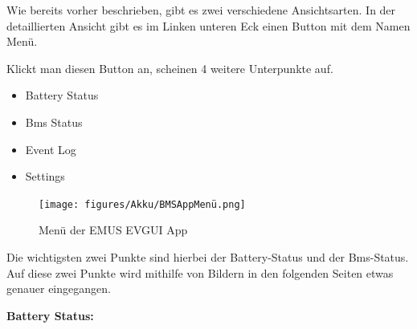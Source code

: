 Wie bereits vorher beschrieben, gibt es zwei verschiedene Ansichtsarten. In der detaillierten Ansicht gibt es im Linken unteren Eck einen Button mit dem Namen Menü.

Klickt man diesen Button an, scheinen 4 weitere Unterpunkte auf. 

\begin{itemize}
\item{Battery Status}\\
\item{Bms Status}\\
\item{Event Log}\\
\item{Settings}\\
\end{itemize}

\begin{figure}[H]
	\begin{center}
		\texttt{[image: figures/Akku/BMSAppMenü.png]}
		\caption{Menü der EMUS EVGUI App\cite{MenüApp}} 
		\label{fig: Menü der EMUS EVGUI App}
	\end{center}
\end{figure}
\newpage

Die wichtigsten zwei Punkte sind hierbei der Battery-Status und der Bms-Status. Auf diese zwei Punkte wird mithilfe von Bildern in den folgenden Seiten etwas genauer eingegangen.

\textbf{Battery Status:}

